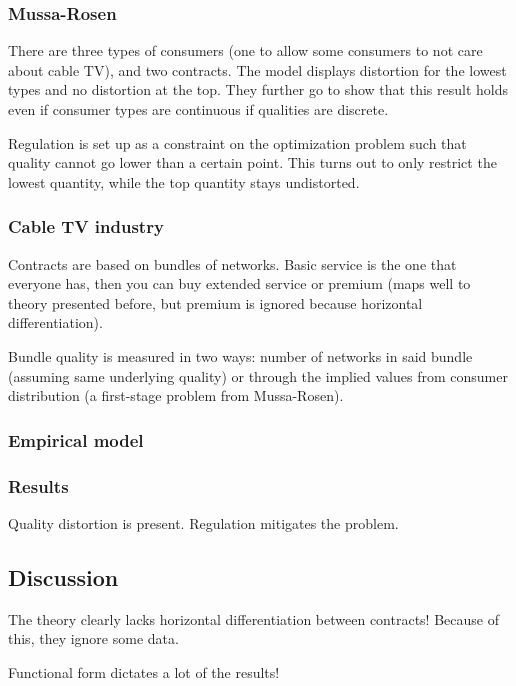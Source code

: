 \subsubsection{Mussa-Rosen}

There are three types of consumers (one to allow some consumers to not care about cable TV), and two contracts. The model displays distortion for the lowest types and no distortion at the top. They further go to show that this result holds even if consumer types are continuous if qualities are discrete.

Regulation is set up as a constraint on the optimization problem such that quality cannot go lower than a certain point. This turns out to only restrict the lowest quantity, while the top quantity stays undistorted.

\subsubsection{Cable TV industry}

Contracts are based on bundles of networks. Basic service is the one that everyone has, then you can buy extended service or premium (maps well to theory presented before, but premium is ignored because horizontal differentiation).

Bundle quality is measured in two ways: number of networks in said bundle (assuming same underlying quality) or through the implied values from consumer distribution (a first-stage problem from Mussa-Rosen).

\subsubsection{Empirical model}



\subsubsection{Results}

Quality distortion is present. Regulation mitigates the problem.

\subsection{Discussion}

The theory clearly lacks horizontal differentiation between contracts! Because of this, they ignore some data.

Functional form dictates a lot of the results!

